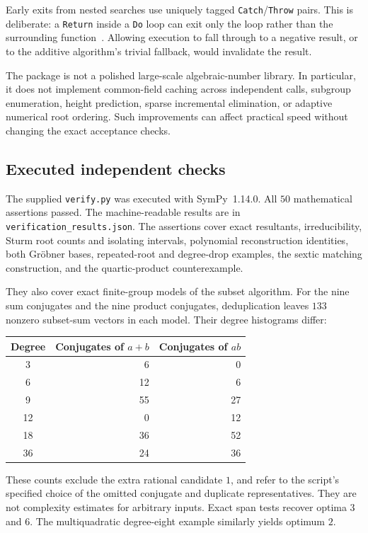 \documentclass[11pt,letterpaper]{article}
\theoremstyle{definition}\newtheorem{definition}[theorem]{Definition}
\theoremstyle{remark}\newtheorem{remark}[theorem]{Remark}
\newcommand{\WL}[1]{\texttt{#1}}
\begin{document}
Early exits from nested searches use uniquely tagged \WL{Catch}/\WL{Throw} pairs. This is deliberate: a \WL{Return} inside a \WL{Do} loop can exit only the loop rather than the surrounding function~\cite{return}. Allowing execution to fall through to a negative result, or to the additive algorithm's trivial fallback, would invalidate the result.

The package is not a polished large-scale algebraic-number library. In particular, it does not implement common-field caching across independent calls, subgroup enumeration, height prediction, sparse incremental elimination, or adaptive numerical root ordering. Such improvements can affect practical speed without changing the exact acceptance checks.

\subsection{Executed independent checks}
The supplied \WL{verify.py} was executed with SymPy~1.14.0. All $50$ mathematical assertions passed. The machine-readable results are in \WL{verification\_results.json}. The assertions cover exact resultants, irreducibility, Sturm root counts and isolating intervals, polynomial reconstruction identities, both Gr\"obner bases, repeated-root and degree-drop examples, the sextic matching construction, and the quartic-product counterexample.

They also cover exact finite-group models of the subset algorithm. For the nine sum conjugates and the nine product conjugates, deduplication leaves $133$ nonzero subset-sum vectors in each model. Their degree histograms differ:
\begin{center}
\begin{tabular}{crr}
\toprule
Degree & Conjugates of $a+b$ & Conjugates of $ab$\\\midrule
3 & 6 & 0\\
6 & 12 & 6\\
9 & 55 & 27\\
12 & 0 & 12\\
18 & 36 & 52\\
36 & 24 & 36\\\bottomrule
\end{tabular}
\end{center}
These counts exclude the extra rational candidate $1$, and refer to the script's specified choice of the omitted conjugate and duplicate representatives. They are not complexity estimates for arbitrary inputs. Exact span tests recover optima $3$ and $6$. The multiquadratic degree-eight example similarly yields optimum $2$.
\end{document}
